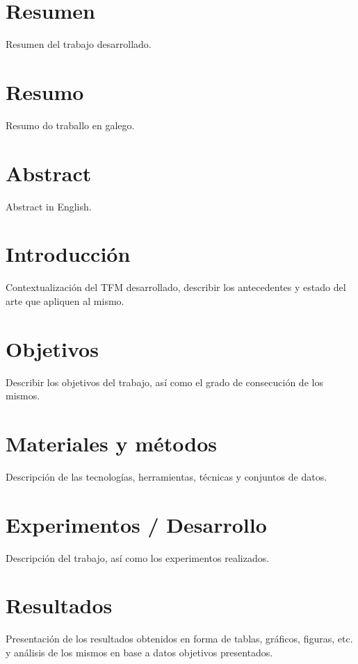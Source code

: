\documentclass{Plantilla/Formato_EPEF}
\begin{document}


\tableofcontents
\newpage
\listoffigures
\newpage
\listoftables
\cleardoublepage

\section*{Resumen}
Resumen del trabajo desarrollado.

\section*{Resumo}
Resumo do traballo en galego.

\section*{Abstract}
Abstract in English.

\newpage
\section{Introducción}
Contextualización del TFM desarrollado, describir los antecedentes y estado del arte que apliquen al mismo.

\newpage
\section{Objetivos}
Describir los objetivos del trabajo, así como el grado de consecución de los mismos.

\newpage
\section{Materiales y métodos}
Descripción de las tecnologías, herramientas, técnicas y conjuntos de datos.

\newpage
\section{Experimentos / Desarrollo}
Descripción del trabajo, así como los experimentos realizados.

\newpage
\section{Resultados}
Presentación de los resultados obtenidos en forma de tablas, gráficos, figuras, etc. y análisis de los mismos en base a datos objetivos presentados.
\end{document}
